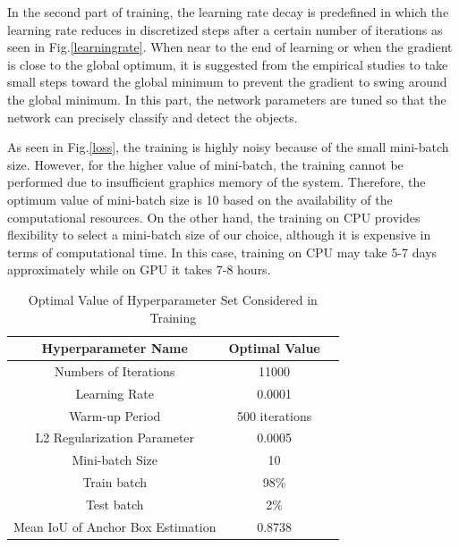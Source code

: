 In the second part of training, the learning rate decay is predefined in which the learning rate reduces in discretized steps after a certain number of iterations as seen in Fig.\ref{learningrate}. When near to the end of learning or when the gradient is close to the global optimum, it is suggested from the empirical studies to take small steps toward the global minimum to prevent the gradient to swing around the global minimum. In this part, the network parameters are tuned so that the network can  precisely classify and detect the objects. 

As seen in Fig.\ref{loss}, the training is highly noisy because of the small mini-batch size. However, for the higher value of mini-batch, the training cannot be performed due to insufficient graphics memory of the system. Therefore, the optimum value of mini-batch size is 10 based on the availability of the computational resources. On the other hand, the training on CPU provides flexibility to select a mini-batch size of our choice, although it is expensive in terms of computational time. In this case, training on CPU may take 5-7 days approximately while on GPU it takes 7-8 hours.

\begin{table}
    \centering
    \begin{tabular}{|c|c|c|}
        \hline
        \textbf{Hyperparameter Name} & \textbf{Optimal Value} \\
        \hline
        Numbers of Iterations & 11000 \\
        \hline
        Learning Rate & 0.0001 \\
        \hline
        Warm-up Period & 500 iterations \\
        \hline
        L2 Regularization Parameter & 0.0005 \\
        \hline  
        Mini-batch Size & 10 \\
        \hline
        Train batch & 98\% \\
        \hline
        Test batch & 2\% \\
        \hline 
        Mean IoU of Anchor Box Estimation & 0.8738 \\
        \hline
    \end{tabular}
    \caption{Optimal Value of Hyperparameter Set Considered in Training}
    \label{opthyper}
\end{table}

